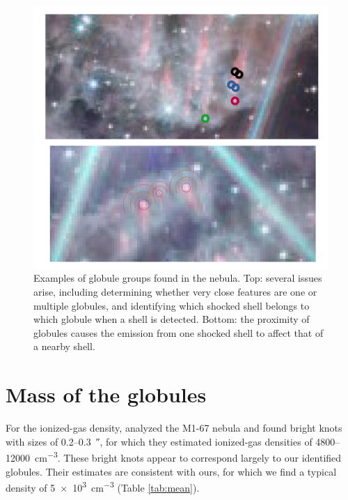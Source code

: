 \documentclass{book}
\begin{document}
\begin{figure}[htb]
    \centering
    \includegraphics[width=\textwidth]{imagenes_corregidas/n_gruops_globules.pdf}
    \caption{Examples of globule groups found in the nebula. Top:
      several issues arise, including determining whether very close
      features are one or multiple globules, and identifying which
      shocked shell belongs to which globule when a shell is detected.
      Bottom: the proximity of globules causes the emission from one
      shocked shell to affect that of a nearby shell.}
    \label{globule_group}
\end{figure}

\section{Mass of the globules}\label{app:masa_glo}

For the ionized-gas density, \cite{Grosdidier:1998} analyzed the
M1-67 nebula and found bright knots with sizes of
0.2--\SI{0.3}{\arcsecond}, for which they estimated ionized-gas
densities of 4800--\SI{12 000}{cm^{-3}}. These bright knots appear to
correspond largely to our identified globules. Their estimates are
consistent with ours, for which we find a typical density of
\SI{5e3}{cm^{-3}} (Table \ref{tab:mean}).
\end{document}
